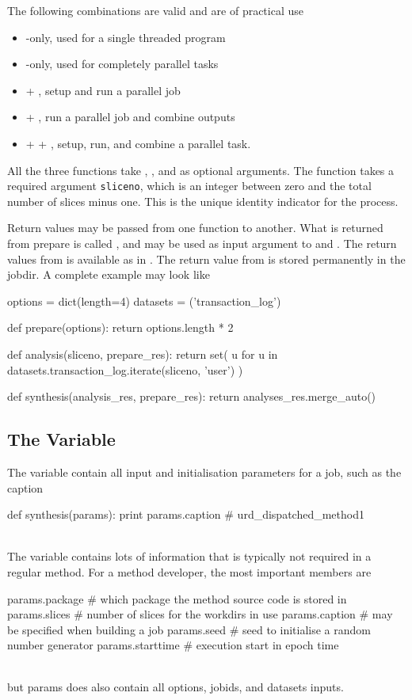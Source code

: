 The following combinations are valid and are of practical use
\begin{itemize}
\item \synthesis-only, used for a single threaded program
\item \analysis-only, used for completely parallel tasks
\item \prepare + \analysis, setup and run a parallel job
\item \analysis + \synthesis, run a parallel job and combine outputs
\item \prepare + \analysis + \synthesis, setup, run, and combine a
  parallel task.
\end{itemize}
All the three functions take \options, \jobids, and \datasets as
optional arguments.  The \analysis function takes a required argument
\texttt{sliceno}, which is an integer between zero and the total
number of slices minus one.  This is the unique identity indicator for
the \analysis process.

Return values may be passed from one function to another.  What is
returned from prepare is called \prepareres, and may be used as input
argument to \analysis and \synthesis.  The return values from
\analysis is available as \analysisres in \synthesis.  The return
value from \synthesis is stored permanently in the jobdir.  A complete
example may look like
\\
\begin{python}
options = dict(length=4)
datasets = ('transaction_log')

def prepare(options):
  return options.length * 2

def analysis(sliceno, prepare_res):
  return set(
    u for u in datasets.transaction_log.iterate(sliceno, 'user')
  )

def synthesis(analysis_res, prepare_res):
   return analyses_res.merge_auto()
\end{python}


\subsection{The \params Variable }
The \params variable contain all input and initialisation parameters
for a job, such as the caption
\\
\begin{python}
def synthesis(params):
  print params.caption
# urd_dispatched_method1
\end{python}
\\
The \params variable contains lots of information that is typically
not required in a regular method.  For a method developer, the most
important members are
\\
\begin{python}
params.package     # which package the method source code is stored in
params.slices      # number of slices for the workdirs in use
params.caption     # may be specified when building a job
params.seed        # seed to initialise a random number generator
params.starttime   # execution start in epoch time
\end{python}
\\
but params does also contain all options, jobids, and datasets inputs.



